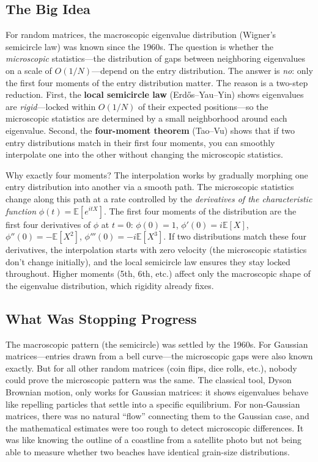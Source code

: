 \subsection{The Big Idea}
For random matrices, the macroscopic eigenvalue distribution (Wigner's semicircle law) was known since the 1960s. The question is whether the \emph{microscopic} statistics---the distribution of gaps between neighboring eigenvalues on a scale of $O(1/N)$---depend on the entry distribution. The answer is \emph{no}: only the first four moments of the entry distribution matter. The reason is a two-step reduction. First, the \textbf{local semicircle law} (Erd\H{o}s--Yau--Yin) shows eigenvalues are \emph{rigid}---locked within $O(1/N)$ of their expected positions---so the microscopic statistics are determined by a small neighborhood around each eigenvalue. Second, the \textbf{four-moment theorem} (Tao--Vu) shows that if two entry distributions match in their first four moments, you can smoothly interpolate one into the other without changing the microscopic statistics.

Why exactly four moments? The interpolation works by gradually morphing one entry distribution into another via a smooth path. The microscopic statistics change along this path at a rate controlled by the \emph{derivatives of the characteristic function} $\phi(t) = \mathbb{E}[e^{itX}]$. The first four moments of the distribution are the first four derivatives of $\phi$ at $t=0$: $\phi(0)=1$, $\phi'(0)=i\mathbb{E}[X]$, $\phi''(0)=-\mathbb{E}[X^2]$, $\phi'''(0)=-i\mathbb{E}[X^3]$. If two distributions match these four derivatives, the interpolation starts with zero velocity (the microscopic statistics don't change initially), and the local semicircle law ensures they stay locked throughout. Higher moments (5th, 6th, etc.) affect only the macroscopic shape of the eigenvalue distribution, which rigidity already fixes.

\subsection{What Was Stopping Progress}
The macroscopic pattern (the semicircle) was settled by the 1960s. For Gaussian matrices---entries drawn from a bell curve---the microscopic gaps were also known exactly. But for all other random matrices (coin flips, dice rolls, etc.), nobody could prove the microscopic pattern was the same. The classical tool, Dyson Brownian motion, only works for Gaussian matrices: it shows eigenvalues behave like repelling particles that settle into a specific equilibrium. For non-Gaussian matrices, there was no natural ``flow'' connecting them to the Gaussian case, and the mathematical estimates were too rough to detect microscopic differences. It was like knowing the outline of a coastline from a satellite photo but not being able to measure whether two beaches have identical grain-size distributions.

